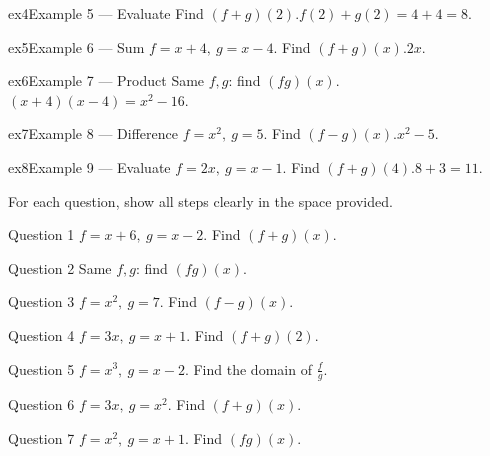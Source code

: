 \documentclass[11pt]{article}
\begin{document}
\begin{example}{ex4}{Example 5 --- Evaluate}
Find $(f+g)(2)$.\soln $f(2)+g(2)=4+4=8$.
\end{example}

\begin{example}{ex5}{Example 6 --- Sum}
$f=x+4,\ g=x-4$. Find $(f+g)(x)$.\soln $2x$.
\end{example}

\begin{example}{ex6}{Example 7 --- Product}
Same $f,g$: find $(fg)(x)$.\soln $(x+4)(x-4)=x^2-16$.
\end{example}

\begin{example}{ex7}{Example 8 --- Difference}
$f=x^2,\ g=5$. Find $(f-g)(x)$.\soln $x^2-5$.
\end{example}

\begin{example}{ex8}{Example 9 --- Evaluate}
$f=2x,\ g=x-1$. Find $(f+g)(4)$.\soln $8+3=11$.
\end{example}

\clearpage
{}
For each question, show all steps clearly in the space provided.

\begin{qbox}{Question 1}
$f=x+6,\ g=x-2$. Find $(f+g)(x)$.\workspace{2.4cm}
\end{qbox}

\begin{qbox}{Question 2}
Same $f,g$: find $(fg)(x)$.\workspace{2.4cm}
\end{qbox}

\begin{qbox}{Question 3}
$f=x^2,\ g=7$. Find $(f-g)(x)$.\workspace{2.4cm}
\end{qbox}

\begin{qbox}{Question 4}
$f=3x,\ g=x+1$. Find $(f+g)(2)$.\workspace{2.4cm}
\end{qbox}

\begin{qbox}{Question 5}
$f=x^3,\ g=x-2$. Find the domain of $\tfrac fg$.\workspace{2.4cm}
\end{qbox}

\begin{qbox}{Question 6}
$f=3x,\ g=x^2$. Find $(f+g)(x)$.\workspace{2.4cm}
\end{qbox}

\begin{qbox}{Question 7}
$f=x^2,\ g=x+1$. Find $(fg)(x)$.\workspace{2.4cm}
\end{qbox}
\end{document}
